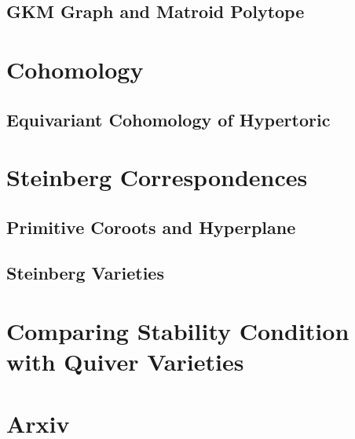 \documentclass[b5paper]{article}
\begin{document}
\subsection{GKM Graph and Matroid Polytope}

\section{Cohomology}

\subsection{Equivariant Cohomology of Hypertoric}
\section{Steinberg Correspondences}
\subsection{Primitive Coroots and Hyperplane}
\subsection{Steinberg Varieties}

\section{Comparing Stability Condition with Quiver Varieties}
\label{sec:quiver_variety}
\section{Arxiv}
\end{document}
